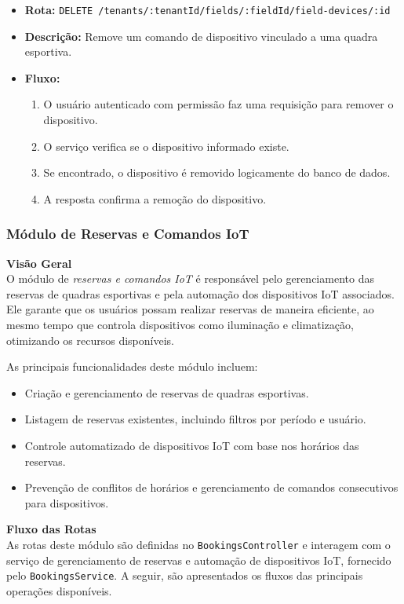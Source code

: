 \begin{itemize}
\item \textbf{Rota:} \texttt{DELETE /tenants/:tenantId/fields/:fieldId/field-devices/:id}
\item \textbf{Descrição:} Remove um comando de dispositivo vinculado a uma quadra esportiva.
\item \textbf{Fluxo:}
\begin{enumerate}
\item O usuário autenticado com permissão faz uma requisição para remover o dispositivo.
\item O serviço verifica se o dispositivo informado existe.
\item Se encontrado, o dispositivo é removido logicamente do banco de dados.
\item A resposta confirma a remoção do dispositivo.
\end{enumerate}
\end{itemize}

\subsubsection{Módulo de Reservas e Comandos IoT}\label{subsubsec:modulo_reservas}

\textbf{Visão Geral}\\
O módulo de \textit{reservas e comandos IoT} é responsável pelo gerenciamento das reservas de quadras esportivas e pela automação dos dispositivos IoT associados. Ele garante que os usuários possam realizar reservas de maneira eficiente, ao mesmo tempo que controla dispositivos como iluminação e climatização, otimizando os recursos disponíveis.

As principais funcionalidades deste módulo incluem:

\begin{itemize}
    \item Criação e gerenciamento de reservas de quadras esportivas.
    \item Listagem de reservas existentes, incluindo filtros por período e usuário.
    \item Controle automatizado de dispositivos IoT com base nos horários das reservas.
    \item Prevenção de conflitos de horários e gerenciamento de comandos consecutivos para dispositivos.
\end{itemize}

\textbf{Fluxo das Rotas}\\
As rotas deste módulo são definidas no \texttt{BookingsController} e interagem com o serviço de gerenciamento de reservas e automação de dispositivos IoT, fornecido pelo \texttt{BookingsService}. A seguir, são apresentados os fluxos das principais operações disponíveis.

